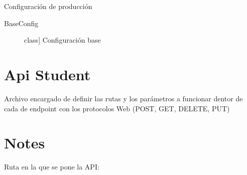 \documentclass[a4paper,10pt,english]{sphinxmanual}
\begin{document}

\begin{fulllineitems}
\label{\detokenize{index:configuration.ProductionConfig}}
\sphinxAtStartPar
Configuración de producción
\begin{description}
\item[{BaseConfig}] \leavevmode{[}class{]}
\sphinxAtStartPar
Configuración base

\end{description}

\end{fulllineitems}

\label{\detokenize{index:module-api3.student_api.api_student}}

\chapter{Api Student}
\label{\detokenize{index:api-student}}
\sphinxAtStartPar
Archivo encargado de definir las rutas y los parámetros a funcionar dentor de cada de
endpoint con los protocolos Web (POST, GET, DELETE, PUT)


\chapter{Notes}
\label{\detokenize{index:notes}}
\sphinxAtStartPar
Ruta en la que se pone la API: 
\end{document}
